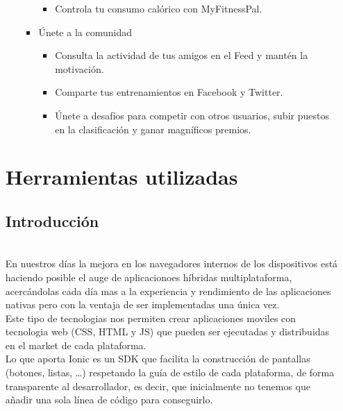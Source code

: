 \documentclass[a4paper, 11pt]{article}
\begin{document}
\begin{itemize}
\begin{itemize}
\begin{itemize}
\begin{itemize}
                                \item {Controla tu consumo calórico con MyFitnessPal.}
                              \end{itemize}
                              \item {Únete a la comunidad}
                              \begin{itemize}
                                \item {Consulta la actividad de tus amigos en el Feed y mantén la motivación.}
                                \item {Comparte tus entrenamientos en Facebook y Twitter.}
                                \item {Únete a desafíos para competir con otros usuarios, subir puestos en la clasificación y ganar magníficos premios.}
                              \end{itemize}
                            \end{itemize}
              \end{itemize}

    \section{Herramientas utilizadas}

        \subsection{Introducción}\\

              En nuestros días la mejora en los navegadores internos de los dispositivos está haciendo
              posible el auge de aplicacionoes híbridas multiplataforma, acercándolas cada día mas a
              la experiencia y rendimiento de las aplicaciones nativas pero con la ventaja de ser
              implementadas una única vez.\\


              Este tipo de tecnologias nos permiten crear aplicaciones moviles con tecnologia web
              (CSS, HTML y JS) que pueden ser ejecutadas y distribuidas en el market de cada plataforma.\\

              Lo que aporta Ionic es un SDK que facilita la construcción de pantallas (botones, listas, …)
              respetando la guía de estilo de cada plataforma, de forma transparente al desarrollador,
              es decir, que inicialmente no tenemos que añadir una sola línea de código para conseguirlo.\\


\end{itemize}
\end{document}
